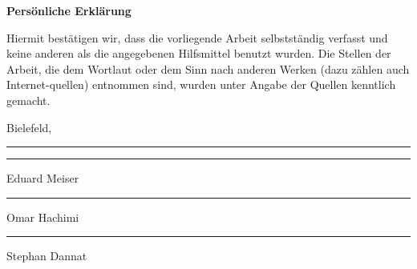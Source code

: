 \textbf{\Large{Persönliche Erklärung}}\vspace{10pt}

Hiermit bestätigen wir, dass die vorliegende Arbeit selbstständig verfasst und keine anderen als die angegebenen Hilfsmittel benutzt wurden. Die Stellen der Arbeit, die dem Wortlaut oder dem Sinn nach anderen Werken (dazu zählen auch Internet-quellen) entnommen sind, wurden unter Angabe der Quellen kenntlich gemacht.

\vspace{50pt}


\noindent Bielefeld,\noindent\rule{4cm}{.4pt} \hfill\rule{5cm}{.4pt}\par
\hfill Eduard Meiser 

\vspace{30pt}
\hfill\rule{5cm}{.4pt}\par
\hfill Omar Hachimi 

\vspace{30pt}
\hfill\rule{5cm}{.4pt}\par
\hfill Stephan Dannat 